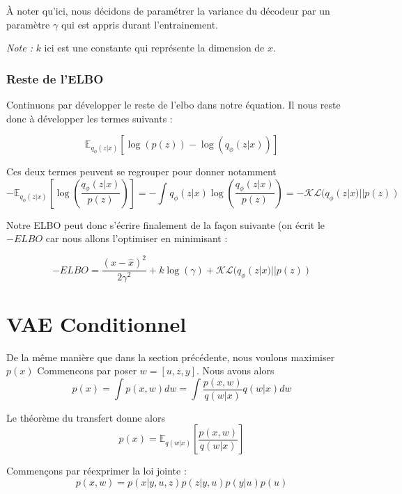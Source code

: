 \documentclass{article}
\begin{document}
À noter qu'ici, nous décidons de paramétrer la variance du décodeur par un paramètre $\gamma$ qui est appris durant l'entrainement.

\emph{Note :} $k$ ici est une constante qui représente la dimension de $x$.

\subsubsection{Reste de l'ELBO}

Continuons par développer le reste de l'elbo dans notre équation.
Il nous reste donc à développer les termes suivants : 

\begin{equation*}
    \mathbb{E}_{q_\phi(z|x)}[\log(p(z)) - \log(q_\phi(z|x))]
\end{equation*}

Ces deux termes peuvent se regrouper pour donner notamment 
\begin{equation*}
    - \mathbb{E}_{q_\phi(z|x)}[\log(\frac{q_\phi(z|x)}{p(z)})] = - \int q_\phi(z|x)\log(\frac{q_\phi(z|x)}{p(z)}) = - \mathcal{KL}(q_\phi(z|x)||p(z))
\end{equation*}

Notre ELBO peut donc s'écrire finalement de la façon suivante (on écrit le $-ELBO$ car nous allons l'optimiser en minimisant :

\begin{equation}
    - ELBO = \frac{(x-\hat{x})^2}{2\gamma^2} + k\log(\gamma) + \mathcal{KL}(q_\phi(z|x)||p(z))
\end{equation}

\section{VAE Conditionnel}

De la même manière que dans la section précédente, nous voulons maximiser $p(x)$ Commencons par poser $w = [u,z,y]$.
Nous avons alors 
\begin{equation}
    p(x) = \int p(x,w)dw = \int \frac{p(x,w)}{q(w|x)}q(w|x)dw
\end{equation}

Le théorème du transfert donne alors 
\begin{equation}
    p(x) = \mathbb{E}_{q(w|x)}[\frac{p(x,w)}{q(w|x)}]
\end{equation}

Commençons par réexprimer la loi jointe :
\begin{equation}
    p(x,w) = p(x|y,u,z)p(z|y,u)p(y|u)p(u)
\end{equation}
\end{document}
